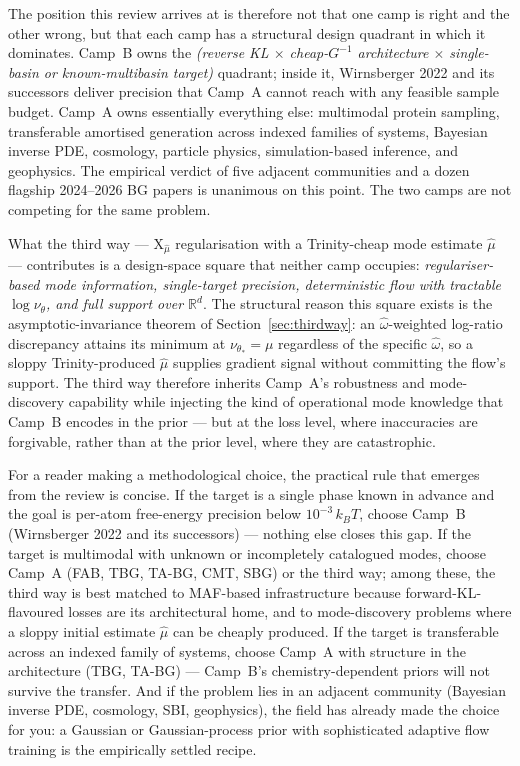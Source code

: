 \documentclass[11pt,letterpaper]{article}
\newcommand{\Real}{\mathbb{R}}
\newcommand{\Xfun}{\mathrm{X}}
\theoremstyle{plain}
\begin{document}
The position this review arrives at is therefore not that one camp is
right and the other wrong, but that each camp has a structural design
quadrant in which it dominates. Camp~B owns the
\emph{(reverse KL $\times$ cheap-$G^{-1}$ architecture $\times$
single-basin or known-multibasin target)} quadrant; inside it, Wirnsberger
2022 and its successors deliver precision that Camp~A cannot reach with
any feasible sample budget. Camp~A owns essentially everything else:
multimodal protein sampling, transferable amortised generation across
indexed families of systems, Bayesian inverse PDE, cosmology, particle
physics, simulation-based inference, and geophysics. The empirical
verdict of five adjacent communities and a dozen flagship 2024--2026 BG
papers is unanimous on this point. The two camps are not competing for
the same problem.

What the third way ---
$\Xfun_{\hat\mu}$ regularisation with a Trinity-cheap mode estimate
$\hat\mu$ --- contributes is a design-space square that neither camp
occupies: \emph{regulariser-based mode information, single-target
precision, deterministic flow with tractable $\log\nu_\theta$, and full
support over $\Real^d$}. The structural reason this square exists is the
asymptotic-invariance theorem of Section~\ref{sec:thirdway}: an
$\hat\omega$-weighted log-ratio discrepancy attains its minimum at
$\nu_{\theta_*}=\mu$ regardless of the specific $\hat\omega$, so a sloppy
Trinity-produced $\hat\mu$ supplies gradient signal without committing the
flow's support. The third way therefore inherits Camp~A's robustness and
mode-discovery capability while injecting the kind of operational mode
knowledge that Camp~B encodes in the prior --- but at the loss level, where
inaccuracies are forgivable, rather than at the prior level, where they
are catastrophic.

For a reader making a methodological choice, the practical rule that
emerges from the review is concise. If the target is a single phase known
in advance and the goal is per-atom free-energy precision below
$10^{-3}\,k_BT$, choose Camp~B (Wirnsberger 2022 and its successors) ---
nothing else closes this gap. If the target is multimodal with unknown or
incompletely catalogued modes, choose Camp~A (FAB, TBG, TA-BG, CMT, SBG)
or the third way; among these, the third way is best matched to MAF-based
infrastructure because forward-KL-flavoured losses are its architectural
home, and to mode-discovery problems where a sloppy initial estimate
$\hat\mu$ can be cheaply produced. If the target is transferable across an
indexed family of systems, choose Camp~A with structure in the
architecture (TBG, TA-BG) --- Camp~B's chemistry-dependent priors will not
survive the transfer. And if the problem lies in an adjacent community
(Bayesian inverse PDE, cosmology, SBI, geophysics), the field has already
made the choice for you: a Gaussian or Gaussian-process prior with sophisticated
adaptive flow training is the empirically settled recipe.
\end{document}
